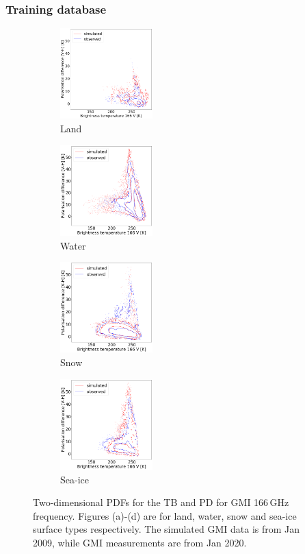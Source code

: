 \documentclass[12pt,oneside,a4paper]{article}
\begin{document}
\subsubsection{Training database}
%
\begin{figure}[t]
	\centering
	\begin{subfigure}{.24\textwidth}
		\caption{Land}
		\includegraphics[height =35mm]{Figures/hist2d_gmi_45-60_land.png}
	\end{subfigure}
	\begin{subfigure}{.24\textwidth}
		\caption{Water}
		\includegraphics[height = 35mm]{Figures/hist2d_gmi_45-60_sea.png}
	\end{subfigure}
	\begin{subfigure}{.24\textwidth}
	\caption{Snow}
	\includegraphics[height = 35mm]{Figures/hist2d_gmi_45-60_snow.png}
\end{subfigure}
\begin{subfigure}{.24\textwidth}
	\caption{ Sea-ice}
	\includegraphics[height = 35mm]{Figures/hist2d_gmi_highlat_sea-ice.png}
\end{subfigure}
	\label{fig:histogram_2d}
	\caption{Two-dimensional PDFs for the TB and PD for GMI 166\,GHz frequency. Figures (a)-(d) are for land, water, snow and sea-ice surface types respectively. The simulated GMI data is from Jan 2009, while GMI measurements are from Jan 2020.}
\end{figure}
\end{document}
